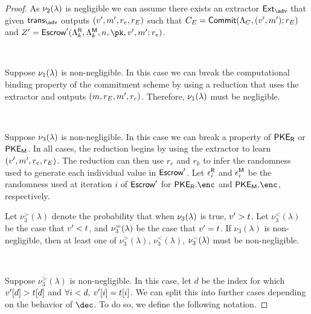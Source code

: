 \begin{proof}
	As $\nu_2(\lambda)$ is negligible we can assume there exists an extractor $\Ext_{\adv}$ that given $\trans_{\adv}$ outputs $(v', m', r_e, r_{E})$ such that $C_{E} = {\sf Commit}(\Lambda_C, (v', m'); r_{E})$ and $\esc'\allowbreak =\allowbreak \escrow'(\allowbreak\pkerpp,\allowbreak \pkempp,\allowbreak \numdigits,\allowbreak \pk,\allowbreak \uval',\allowbreak \msg'; r_e)$.

	${}$

	Suppose $\nu_1(\lambda)$ is non-negligible.
	In this case we can break the computational binding property of the commitment scheme by using a reduction that uses the extractor and outputs $(m, r_{E}, m', r_c)$.
	Therefore, $\nu_1(\lambda)$ must be negligible.

	${}$

	Suppose $\nu_3(\lambda)$ is non-negligible.
	In this case we can break a property of ${{\mathsf{PKE}_{{\mathsf{R}}}}}$ or ${{\mathsf{PKE}_{{\mathsf{M}}}}}$.
	In all cases, the reduction begins by using the extractor to learn $(v', m', r_e, r_{E})$.
	The reduction can then use $r_e$ and $r_k$ to infer the randomness used to generate each individual value in ${\sf Escrow}'$.
	Let $\epsilon^{{{\mathsf{R}}}}_i$ and $\epsilon^{{{\mathsf{M}}}}_i$ be the randomness used at iteration $i$ of ${\sf Escrow}'$ for $\pker.\enc$ and $\pkem.\enc$, respectively.

	Let $\nu_3^{>}(\lambda)$ denote the probability that when $\nu_3(\lambda)$ is true,  $v' > t$.
	Let  $\nu_3^{<}(\lambda)$ be the case that $v' < t$, and $\nu_3^{=}(\lambda)$ be the case that $v' = t$.
	If $\nu_3(\lambda)$ is non-negligible, then at least one of $\nu_3^{>}(\lambda)$, $\nu_3^{<}(\lambda)$, $\nu_3^{=}(\lambda)$ must be non-negligible.

	${}$

	Suppose $\nu_3^{>}(\lambda)$ is non-negligible.
	In this case, let $d$ be the index for which $v'[d] > t[d]$ and $\forall i < d,\: v'[i] = t[i]$.
	We can split this into further cases depending on the behavior of $\dec$.
	To do so, we define the following notation.


\end{proof}
